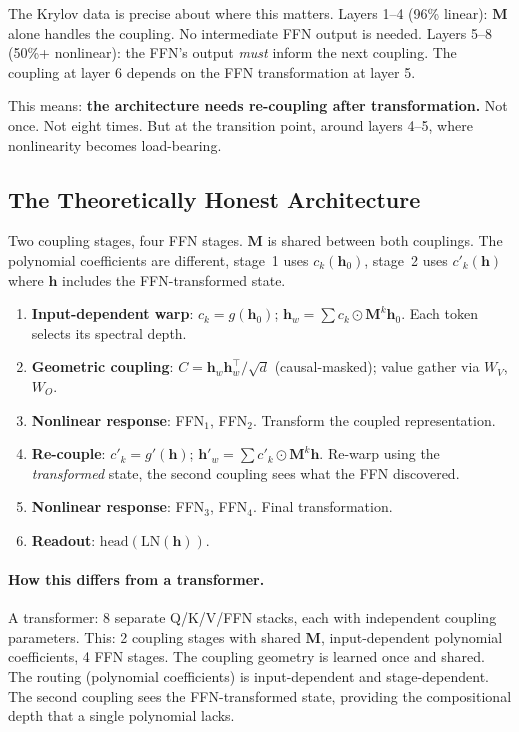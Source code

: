\documentclass[11pt, a4paper]{article}
\newcommand{\M}{\mathbf{M}}
\newcommand{\h}{\mathbf{h}}
\theoremstyle{plain}
\theoremstyle{definition}
\theoremstyle{remark}
\begin{document}
The Krylov data is precise about where this matters.
Layers 1--4 (96\% linear): $\M$ alone handles the coupling.
No intermediate FFN output is needed.
Layers 5--8 (50\%+ nonlinear): the FFN's output \emph{must} inform the next coupling.
The coupling at layer 6 depends on the FFN transformation at layer 5.

This means: \textbf{the architecture needs re-coupling after transformation.}
Not once.
Not eight times.
But at the transition point, around layers 4--5, where nonlinearity becomes load-bearing.

\subsection{The Theoretically Honest Architecture}

Two coupling stages, four FFN stages.
$\M$ is shared between both couplings.
The polynomial coefficients are different, stage~1 uses $c_k(\h_0)$, stage~2 uses $c'_k(\h)$ where $\h$ includes the FFN-transformed state.

\begin{enumerate}[nosep]
\item \textbf{Input-dependent warp}: $c_k = g(\h_0)$; \quad $\h_w = \sum c_k \odot \M^k \h_0$.
      Each token selects its spectral depth.
\item \textbf{Geometric coupling}: $C = \h_w \h_w^\top / \sqrt{d}$ (causal-masked); value gather via $W_V$, $W_O$.
\item \textbf{Nonlinear response}: FFN$_1$, FFN$_2$. Transform the coupled representation.
\item \textbf{Re-couple}: $c'_k = g'(\h)$; \quad $\h'_w = \sum c'_k \odot \M^k \h$.
      Re-warp using the \emph{transformed} state, the second coupling sees what the FFN discovered.
\item \textbf{Nonlinear response}: FFN$_3$, FFN$_4$. Final transformation.
\item \textbf{Readout}: $\text{head}(\text{LN}(\h))$.
\end{enumerate}

\paragraph{How this differs from a transformer.}
A transformer: 8 separate Q/K/V/FFN stacks, each with independent coupling parameters.
This: 2 coupling stages with shared $\M$, input-dependent polynomial coefficients, 4 FFN stages.
The coupling geometry is learned once and shared.
The routing (polynomial coefficients) is input-dependent and stage-dependent.
The second coupling sees the FFN-transformed state, providing the compositional depth that a single polynomial lacks.
\end{document}
